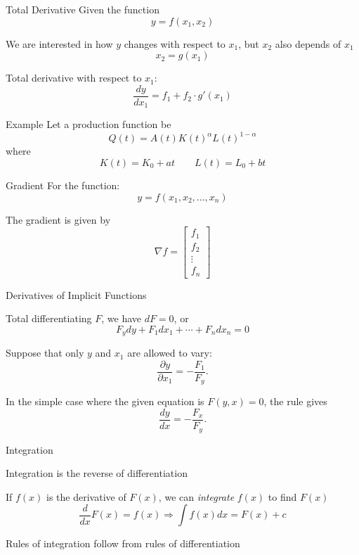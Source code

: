 \documentclass{./../../Latex/teaching_slides}
\begin{document}
\begin{frame}{Total Derivative}
Given the function 
\[ y = f(x_1, x_2) \]

We are interested in how $y$ changes with respect to $x_1$, but $x_2$ also depends of $x_1$
\[ x_2 = g(x_1) \]

Total derivative with respect to $x_1$:
\[ \frac{dy}{dx_1} =  f_1+f_2 \cdot g'(x_1)   \]

\end{frame}

\begin{frame}{Example}
Let a production function be
$$
Q(t) = A(t) K(t)^{\alpha} L(t)^{1-\alpha} 
$$
where 
$$
K(t) = K_0 + at  \quad \quad L(t) = L_0 + bt
$$
\end{frame}


\begin{frame}{Gradient}
For the function:
$$ y = f(x_1, x_2,...,x_n) $$ 
\vspace{0.5em}

The gradient is given by
$$ \nabla f = \begin{bmatrix}
	f_1 \\
	f_2 \\
	\vdots \\
	f_n
\end{bmatrix} $$
\end{frame}

\begin{frame}{Derivatives of Implicit Functions}

Total differentiating $F$, we have $d F=0$, or
$$
F_{y} d y+F_{1} d x_{1}+\cdots+F_{n} d x_{n}=0 
$$

\vspace{1em}
Suppose that only $y$ and $x_{1}$ are allowed to vary:
$$
\frac{\partial y}{\partial x_{1}}=-\frac{F_{1}}{F_{y}} .
$$

\vspace{1em}
In the simple case where the given equation is $F(y, x)=0$, the rule gives
$$
\frac{d y}{d x}=-\frac{F_{x}}{F_{y}} .
$$
\end{frame}

\begin{frame}{Integration}
\begin{witemize}
  \item Integration is the reverse of differentiation 
  \item If $f(x)$ is the derivative of $F(x)$, we can \textit{integrate} $f(x)$ to find $F(x)$
  $$ \frac{d}{d x} F(x)=f(x) \Rightarrow \int f(x) d x=F(x)+c $$
  \item Rules of integration follow from rules of differentiation
\end{witemize}
\end{frame}
\end{document}

